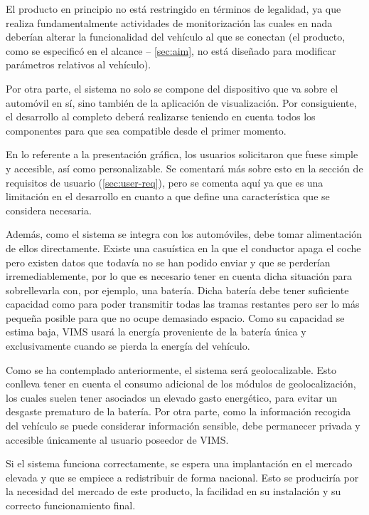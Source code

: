 El producto en principio no está restringido en términos de legalidad, ya que 
realiza fundamentalmente actividades de monitorización las cuales en nada deberían
alterar la funcionalidad del vehículo al que se conectan 
(el producto, como se especificó en el alcance
-- \ref{sec:aim}, no está diseñado para modificar parámetros relativos al
vehículo).

Por otra parte, el sistema no solo se compone del dispositivo que va sobre el
automóvil en sí, sino también de la aplicación de visualización. Por
consiguiente, el desarrollo al completo deberá realizarse teniendo en cuenta
todos los componentes para que sea compatible desde el primer momento.

En lo referente a la presentación gráfica, los usuarios solicitaron que fuese
simple y accesible, así como personalizable. Se comentará más sobre esto en la
sección de requisitos de usuario (\ref{sec:user-req}), pero se comenta aquí ya
que es una limitación en el desarrollo en cuanto a que define una característica
que se considera necesaria.

Además, como el sistema se integra con los automóviles, debe tomar alimentación de
ellos directamente. Existe una casuística en la que el conductor apaga el
coche pero existen datos que todavía no se han podido enviar y que se
perderían irremediablemente, por lo que es necesario tener en cuenta dicha
situación para sobrellevarla con, por ejemplo, una batería. Dicha batería
debe tener suficiente capacidad como para poder transmitir todas las tramas
restantes pero ser lo más pequeña posible para que no ocupe demasiado espacio.
Como su capacidad se estima baja,
\ac{VIMS} usará la energía proveniente de la batería única y exclusivamente
cuando se pierda la energía del vehículo.

Como se ha contemplado anteriormente, el sistema será geolocalizable. Esto
conlleva tener en cuenta el consumo adicional de los módulos de geolocalización,
los cuales suelen tener asociados un elevado gasto energético, para evitar
un desgaste prematuro de la batería. Por otra parte, como la información recogida
del vehículo se puede considerar información sensible, debe permanecer privada y 
accesible únicamente al usuario poseedor de \ac{VIMS}.

Si el sistema funciona correctamente, se espera una implantación en el mercado
elevada y que se empiece a redistribuir de forma nacional. Esto se produciría
por la necesidad del mercado de este producto, la facilidad en su instalación y
su correcto funcionamiento final.